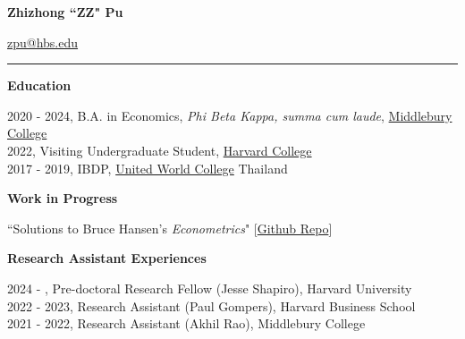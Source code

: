 \documentclass{article}
\begin{document}
{\Large \textbf{Zhizhong ``ZZ" Pu}\par}
    \href{mailto:zpu@hbs.edu}{zpu@hbs.edu} \href{https://github.com/zhizhongpu}{\faGithub} \hspace{0.2em} \\
    \vspace{-0.1in}
    \rule{\textwidth}{1pt}
    \vspace{0in}

{\Large \textbf{Education}}\\
    \vspace{-0.15in}
	\begin{adjustwidth}{1.5em}{0pt}
        2020 - 2024, B.A. in Economics, \textit{Phi Beta Kappa, summa cum laude}, \href{http://www.middlebury.edu/}{Middlebury College}\\
        2022, Visiting Undergraduate Student, \href{http://www.harvard.edu/}{Harvard College}\\
        2017 - 2019, IBDP, \href{https://www.uwc.org/about}{United World College} Thailand
    \end{adjustwidth}
    \vspace{0.1in}


{\Large \textbf{Work in Progress}}\\
    \vspace{-0.15in}
	\begin{adjustwidth}{1.5em}{0pt}     
        ``Solutions to Bruce Hansen's \textit{Econometrics}" [\href{https://github.com/zhizhongpu/solutions_econometrics_hansen}{Github Repo}]
    \end{adjustwidth}
    \vspace{0.1in}
	
{\Large \textbf{Research Assistant Experiences}}
\begin{adjustwidth}{1.5em}{0pt}
    2024 - , Pre-doctoral Research Fellow (Jesse Shapiro), Harvard University \\
    2022 - 2023, Research Assistant (Paul Gompers), Harvard Business School \\
    2021 - 2022, Research Assistant (Akhil Rao), Middlebury College
\end{adjustwidth}
\vspace{0.1in}


\end{document}
